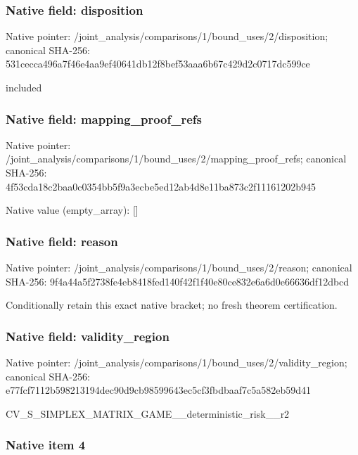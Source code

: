 \documentclass[10pt,a4paper]{article}
\begin{document}
\subsubsection{Native field: disposition}


Native pointer: /joint\_analysis/comparis\allowbreak{}ons/1/bound\_uses/2/dispo\allowbreak{}sition; canonical SHA-256: 531cecca496a7f46e4aa9ef4\allowbreak{}0641db12f8bef53aaa6b67c4\allowbreak{}29d2c0717dc599ce


included


\subsubsection{Native field: mapping\_proof\_refs}


Native pointer: /joint\_analysis/comparis\allowbreak{}ons/1/bound\_uses/2/mappi\allowbreak{}ng\_proof\_refs; canonical SHA-256: 4f53cda18c2baa0c0354bb5f\allowbreak{}9a3ecbe5ed12ab4d8e11ba87\allowbreak{}3c2f11161202b945



Native value (empty\_array): []



\subsubsection{Native field: reason}


Native pointer: /joint\_analysis/comparis\allowbreak{}ons/1/bound\_uses/2/reaso\allowbreak{}n; canonical SHA-256: 9f4a44a5f2738fe4eb8418fe\allowbreak{}d140f42f1f40e80ce832e6a6\allowbreak{}d0e66636df12dbcd


Conditionally retain this exact native bracket; no fresh theorem certification.


\subsubsection{Native field: validity\_region}


Native pointer: /joint\_analysis/comparis\allowbreak{}ons/1/bound\_uses/2/valid\allowbreak{}ity\_region; canonical SHA-256: e77fcf7112b598213194dec9\allowbreak{}0d9cb98599643ec5cf3fbdba\allowbreak{}af7c5a582eb59d41


CV\_S\_SIMPLEX\_MATRIX\_GAME\allowbreak{}\_\_deterministic\_risk\_\_r2


\subsubsection{Native item 4}
\end{document}
